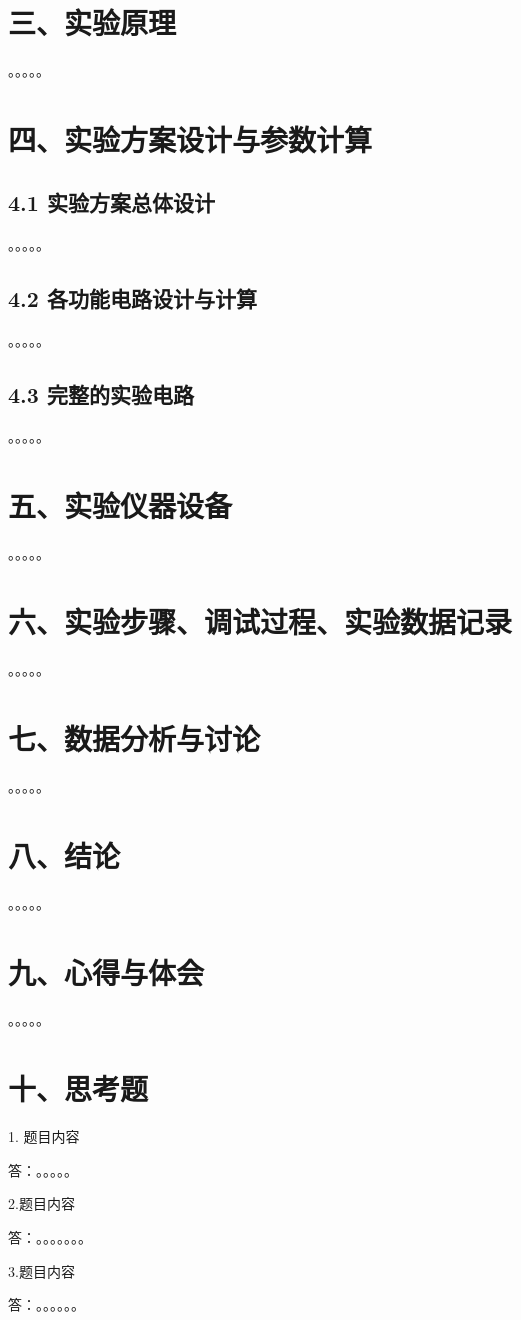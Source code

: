 \documentclass[12pt,a4paper]{article}
\begin{document}
\section*{三、实验原理}
。。。。。

\section*{四、实验方案设计与参数计算}
\subsection*{4.1 实验方案总体设计}
。。。。。

\subsection*{4.2 各功能电路设计与计算}
。。。。。

\subsection*{4.3 完整的实验电路}
。。。。。

\section*{五、实验仪器设备}
。。。。。

\section*{六、实验步骤、调试过程、实验数据记录}
。。。。。

\section*{七、数据分析与讨论}
。。。。。

\section*{八、结论}
。。。。。

\section*{九、心得与体会}
。。。。。

\section*{十、思考题}
1. 题目内容

答：。。。。。

2.题目内容

答：。。。。。。。

3.题目内容

答：。。。。。。
\end{document}
